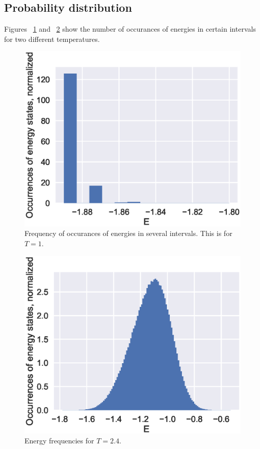 \documentclass[aps,reprint]{revtex4-1}
\begin{document}
\subsection{Probability distribution}
Figures ~\ref{fig:4da} and ~\ref{fig:4db} show the number of occurances of energies
in certain intervals for two different temperatures.
\begin{figure}
  \includegraphics[width=\columnwidth]{figures/4da.eps}
  \caption{Frequency of occurances of energies in several intervals. This is
  for $T = 1$.}
  \label{fig:4da}
\end{figure}
\begin{figure}
  \includegraphics[width=\columnwidth]{figures/4db.eps}
  \caption{Energy frequencies for $T = 2.4$.}
  \label{fig:4db}
\end{figure}
\end{document}
